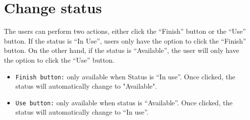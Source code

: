 \documentclass[conference]{IEEEtran}
\begin{document}
\section*{Change status}
The users can perform two actions, either click the “Finish” button or the “Use” button. If the status is “In Use”, users only have the option to click the “Finish” button. On the other hand, if the status is “Available”, the user will only have the option to click the “Use” button.
\begin{itemize}
    \item \texttt{Finish button:} only available when Status is “In use”. Once clicked, the status will automatically change to "Available".
    \item \texttt{Use button:} only available when status is “Available”. Once clicked, the status will automatically change to “In use”.
\end{itemize}
\end{document}
